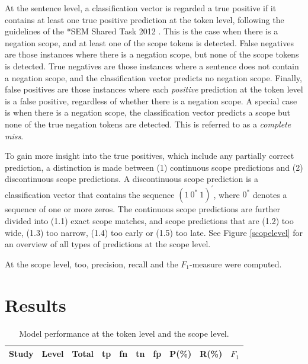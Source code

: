 \documentclass{article}
\begin{document}
\begin{multicols}{2}

At the sentence level, a classification vector is regarded a true positive if it contains at least one true positive prediction at the token level, following the guidelines of the *SEM Shared Task 2012 \citep{SEM-shared-task}. This is the case when there is a negation scope, and at least one of the scope tokens is detected. False negatives are those instances where there is a negation scope, but none of the scope tokens is detected. True negatives are those instances where a sentence does not contain a negation scope, and the classification vector predicts no negation scope. Finally, false positives are those instances where each \textit{positive} prediction at the token level is a false positive, regardless of whether there is a negation scope. A special case is when there is a negation scope, the classification vector predicts a scope but none of the true negation tokens are detected. This is referred to as a \textit{complete miss}. 

To gain more insight into the true positives, which include any partially correct prediction, a distinction is made between (1) continuous scope predictions and (2) discontinuous scope predictions. A discontinuous scope prediction is a classification vector that contains the sequence $(1~0^{*}~1)^{\prime}$, where $0^{*}$ denotes a sequence of one or more zeros. The continuous scope predictions are further divided into (1.1) exact scope matches, and scope predictions that are (1.2) too wide, (1.3) too narrow, (1.4) too early or (1.5) too late. See Figure \ref{scopelevel} for an overview of all types of predictions at the scope level.

At the scope level, too, precision, recall and the $F_1$-measure were computed.

\section{Results}

\begin{table}[t]
\caption{Model performance at the token level and the scope level.}
\label{allresults}
	\centering
	\begin{tabular}{l c | c c c c c | c c c}
	\hline
	Study & Level & Total & tp & fn & tn & fp & P(\%) & R(\%) & $F_1$ \\
	\hline \hline
	

\end{tabular}
\end{table}
\end{multicols}
\end{document}
